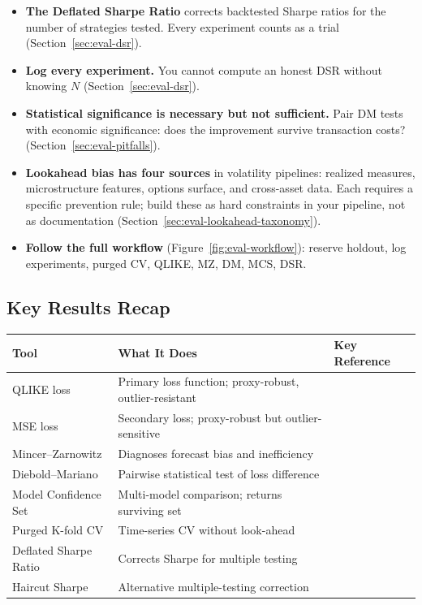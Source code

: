 \begin{itemize}[nosep]
  \item \textbf{The Deflated Sharpe Ratio} corrects backtested Sharpe ratios for the number of strategies tested. Every experiment counts as a trial \citep{Bailey2014DSR} (Section~\ref{sec:eval-dsr}).

  \item \textbf{Log every experiment.} You cannot compute an honest DSR without knowing $N$ (Section~\ref{sec:eval-dsr}).

  \item \textbf{Statistical significance is necessary but not sufficient.} Pair DM tests with economic significance: does the improvement survive transaction costs? (Section~\ref{sec:eval-pitfalls}).

  \item \textbf{Lookahead bias has four sources} in volatility pipelines: realized measures, microstructure features, options surface, and cross-asset data. Each requires a specific prevention rule; build these as hard constraints in your pipeline, not as documentation (Section~\ref{sec:eval-lookahead-taxonomy}).

  \item \textbf{Follow the full workflow} (Figure~\ref{fig:eval-workflow}): reserve holdout, log experiments, purged CV, QLIKE, MZ, DM, MCS, DSR.
\end{itemize}

\subsection{Key Results Recap}

\begin{center}
\begin{tabular}{p{3.2cm} p{4.5cm} p{5.5cm}}
\toprule
\textbf{Tool} & \textbf{What It Does} & \textbf{Key Reference} \\
\midrule
QLIKE loss & Primary loss function; proxy-robust, outlier-resistant & \citet{Patton2011} \\
MSE loss & Secondary loss; proxy-robust but outlier-sensitive & \citet{Patton2011} \\
Mincer--Zarnowitz & Diagnoses forecast bias and inefficiency & \citet{MincerZarnowitz1969} \\
Diebold--Mariano & Pairwise statistical test of loss difference & \citet{DieboldMariano1995} \\
Model Confidence Set & Multi-model comparison; returns surviving set & \citet{HansenLundeNason2011} \\
Purged K-fold CV & Time-series CV without look-ahead & \citet{LopezdePrado2018} \\
Deflated Sharpe Ratio & Corrects Sharpe for multiple testing & \citet{Bailey2014DSR} \\
Haircut Sharpe & Alternative multiple-testing correction & \citet{HarveyLiu2015} \\
\bottomrule
\end{tabular}
\end{center}
